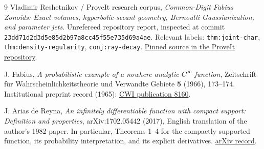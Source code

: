 \documentclass[11pt,a4paper]{article}
\numberwithin{equation}{section}
\theoremstyle{definition}
\theoremstyle{remark}\newtheorem{remark}[theorem]{Remark}
\begin{document}
\begingroup
\small
\setlength{\parskip}{0pt}
\begin{thebibliography}{9}
Vladimir Reshetnikov / ProveIt research corpus,
\emph{Common-Digit Fabius Zonoids: Exact volumes, hyperbolic-secant geometry,
Bernoulli Gaussianization, and parameter jets}.
Unrefereed repository report, inspected at commit
\texttt{23dd71d2d3d5e85d2b97a8cc45f55e735d69a4ae}.
Relevant labels: \texttt{thm:joint-char}, \texttt{thm:density-regularity},
\texttt{conj:ray-decay}.
\href{https://github.com/VladimirReshetnikov/ProveIt/blob/23dd71d2d3d5e85d2b97a8cc45f55e735d69a4ae/Analysis/FabiusFunction/docs/semi-formalized-research-frontiers/drafts/representations/common_digit_fabius_zonoids_frontier_report/common_digit_fabius_zonoids.tex}{Pinned source in the ProveIt repository}.

J. Fabius, \emph{A probabilistic example of a nowhere analytic
$C^\infty$-function}, Zeitschrift f\"ur Wahrscheinlichkeitstheorie und
Verwandte Gebiete \textbf{5} (1966), 173--174.
Institutional preprint record (1965):
\href{https://ir.cwi.nl/pub/8160}{CWI publication 8160}.

J. Arias de Reyna, \emph{An infinitely differentiable function with compact
support: Definition and properties}, arXiv:1702.05442 (2017), English
translation of the author's 1982 paper. In particular, Theorems 1--4 for the
compactly supported function, its probability interpretation, and its
explicit derivatives.
\href{https://arxiv.org/abs/1702.05442}{arXiv record}.
\end{thebibliography}
\endgroup
\end{document}
